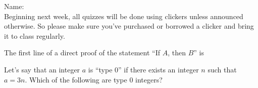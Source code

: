 \documentclass[addpoints]{exam}
\begin{document}
		
\vspace*{0pt}

\noindent
Name: \underline{\hspace{2in}} \\


\noindent
Beginning next week, all quizzes will be done using clickers unless announced otherwise. So please make sure you've purchased or borrowed a clicker and bring it to class regularly. 

\begin{questions}
	
	\question[1] The first line of a direct proof of the statement ``If $A$, then $B$'' is
	
	
	\question[1] Let's say that an integer $a$ is ``type 0'' if there exists an integer $n$ such that $a = 3n$. Which of the following are type 0 integers? 
\end{questions}
\end{document}
